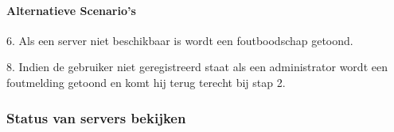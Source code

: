 \begin{compact}
\paragraph{Alternatieve Scenario's}
\begin{enumerate_compact}
	\item[6.] Als een server niet beschikbaar is wordt een foutboodschap getoond.
	\item[8.] Indien de gebruiker niet geregistreerd staat als een administrator wordt een foutmelding getoond en komt hij terug terecht bij stap 2.
\end{enumerate_compact}
\end{compact}

\subsubsection{Status van servers bekijken}
